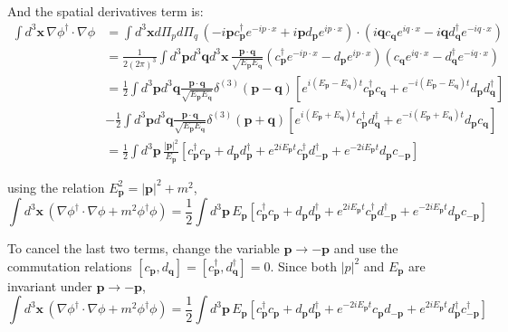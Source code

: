 \documentclass[a4paper,11pt]{article}
\begin{document}
And the spatial derivatives term is:
\begin{align}
    \int d^3\mathbf{x}\, \nabla\phi^\dagger\cdot\nabla\phi 
    &= \int d^3\mathbf{x} d\Pi_p d\Pi_q\, \left(-i\mathbf{p}c_{\mathbf{p}}^\dagger e^{-ip\cdot x} + i\mathbf{p}d_{\mathbf{p}} e^{ip\cdot x}\right)\cdot\left(i\mathbf{q}c_{\mathbf{q}} e^{iq\cdot x} - i\mathbf{q}d_{\mathbf{q}}^\dagger e^{-iq\cdot x}\right) \\
    &=\frac{1}{2(2\pi)^3}\int d^3\mathbf{p}d^3\mathbf{q}d^3\mathbf{x}\, \frac{\mathbf{p}\cdot\mathbf{q}}{\sqrt{E_{\mathbf{p}}E_{\mathbf{q}}}} \left(c_{\mathbf{p}}^\dagger e^{-ip\cdot x} - d_{\mathbf{p}} e^{ip\cdot x}\right)\left(c_{\mathbf{q}} e^{iq\cdot x} - d_{\mathbf{q}}^\dagger e^{-iq\cdot x}\right) \\
    &= \frac{1}{2}\int d^3\mathbf{p}d^3\mathbf{q} \frac{\mathbf{p}\cdot\mathbf{q}}{\sqrt{E_{\mathbf{p}}E_{\mathbf{q}}}} \delta^{(3)}(\mathbf{p}-\mathbf{q})\left[e^{i(E_{\mathbf{p}}-E_{\mathbf{q}})t}c_{\mathbf{p}}^\dagger c_{\mathbf{q}} + e^{-i(E_{\mathbf{p}}-E_{\mathbf{q}})t}d_{\mathbf{p}} d_{\mathbf{q}}^\dagger\right] \\
    &-\frac{1}{2}\int d^3\mathbf{p}d^3\mathbf{q} \frac{\mathbf{p}\cdot\mathbf{q}}{\sqrt{E_{\mathbf{p}}E_{\mathbf{q}}}} \delta^{(3)}(\mathbf{p}+\mathbf{q})\left[e^{i(E_{\mathbf{p}}+E_{\mathbf{q}})t}c_{\mathbf{p}}^\dagger d_{\mathbf{q}}^\dagger + e^{-i(E_{\mathbf{p}}+E_{\mathbf{q}})t}d_{\mathbf{p}}c_{\mathbf{q}}\right] \\
    &=\frac{1}{2}\int d^3\mathbf{p}\, \frac{|\mathbf{p}|^2}{E_{\mathbf{p}}}\left[c_{\mathbf{p}}^\dagger c_{\mathbf{p}} + d_{\mathbf{p}} d_{\mathbf{p}}^\dagger + e^{2iE_{\mathbf{p}}t}c_{\mathbf{p}}^\dagger d_{-\mathbf{p}}^\dagger + e^{-2iE_{\mathbf{p}}t}d_{\mathbf{p}}c_{-\mathbf{p}}\right]
\end{align}

using the relation $E_{\mathbf{p}}^2 = |\mathbf{p}|^2 + m^2$, 
\begin{equation}
    \int d^3\mathbf{x}\, \left(\nabla\phi^\dagger\cdot\nabla\phi + m^2\phi^\dagger\phi\right) = \frac{1}{2}\int d^3\mathbf{p}\, E_{\mathbf{p}}\left[c_{\mathbf{p}}^\dagger c_{\mathbf{p}} + d_{\mathbf{p}} d_{\mathbf{p}}^\dagger + e^{2iE_{\mathbf{p}}t}c_{\mathbf{p}}^\dagger d_{-\mathbf{p}}^\dagger + e^{-2iE_{\mathbf{p}}t}d_{\mathbf{p}}c_{-\mathbf{p}}\right]
\end{equation}

To cancel the last two terms, change the variable $\mathbf{p}\to -\mathbf{p}$ and use the commutation relations $[c_{\mathbf{p}}, d_{\mathbf{q}}] = [c_{\mathbf{p}}^\dagger, d_{\mathbf{q}}^\dagger]=0$. Since both $|p|^2$ and $E_{\mathbf{p}}$ are invariant under $\mathbf{p}\to -\mathbf{p}$,
\begin{equation}
    \int d^3\mathbf{x}\, \left(\nabla\phi^\dagger\cdot\nabla\phi + m^2\phi^\dagger\phi\right) = \frac{1}{2}\int d^3\mathbf{p}\, E_{\mathbf{p}}\left[c_{\mathbf{p}}^\dagger c_{\mathbf{p}} + d_{\mathbf{p}} d_{\mathbf{p}}^\dagger + e^{-2iE_{\mathbf{p}}t}c_{\mathbf{p}}d_{-\mathbf{p}}+e^{2iE_{\mathbf{p}}t}d_{\mathbf{p}}^\dagger c_{-\mathbf{p}}^\dagger\right]
\end{equation}
\end{document}
